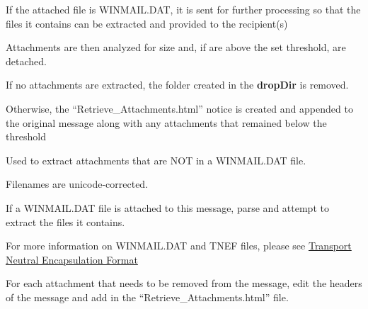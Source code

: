 \documentclass[letterpaper,10pt,english]{sphinxmanual}
\begin{document}
\begin{fulllineitems}
\begin{fulllineitems}
If the attached file is WINMAIL.DAT, it is sent for further processing so that the files it contains
can be extracted and provided to the recipient(s)

Attachments are then analyzed for size and, if are above the set threshold, are detached.

If no attachments are extracted, the folder created in the \textbf{dropDir} is removed.

Otherwise, the ``Retrieve\_Attachments.html'' notice is created and appended to the original message along
with any attachments that remained below the threshold

\end{fulllineitems}


\begin{fulllineitems}
\label{codedocs/EARSmilter:EARSmilter.EARSmilter.ProcessMessage.extract_attachment}
Used to extract attachments that are NOT in a WINMAIL.DAT file.

Filenames are unicode-corrected.

\end{fulllineitems}


\begin{fulllineitems}
\label{codedocs/EARSmilter:EARSmilter.EARSmilter.ProcessMessage.winmail_parse}
If a WINMAIL.DAT file is attached to this message, parse and attempt to extract the files it contains.

For more information on WINMAIL.DAT and TNEF files, please see \href{http://en.wikipedia.org/wiki/Transport\_Neutral\_Encapsulation\_Format}{Transport Neutral Encapsulation Format}

\end{fulllineitems}


\begin{fulllineitems}
\label{codedocs/EARSmilter:EARSmilter.EARSmilter.ProcessMessage.delete_attachments}
For each attachment that needs to be removed from the message,
edit the headers of the message and add in the ``Retrieve\_Attachments.html'' file.


\end{fulllineitems}
\end{fulllineitems}
\end{document}
